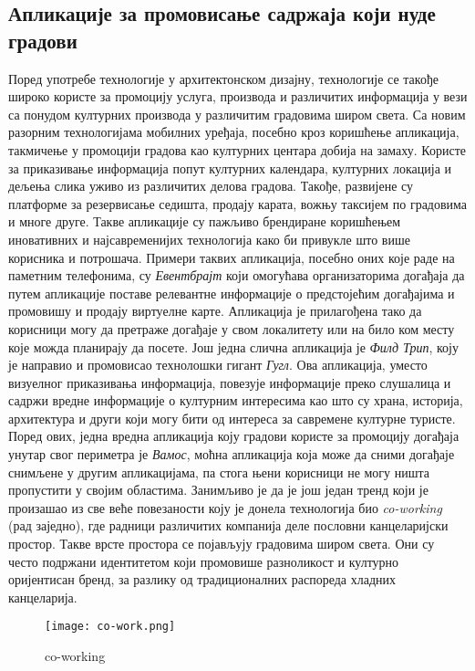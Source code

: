 \documentclass{article}
\begin{document}
\subsection{Апликације за промовисање садржаја који нуде градови}
Поред употребе технологије у архитектонском дизајну, технологије се такође широко користе за промоцију услуга, производа и различитих информација у вези са понудом културних производа у различитим градовима широм света. Са новим разорним технологијама мобилних уређаја, посебно кроз коришћење апликација, такмичење у промоцији градова као културних центара добија на замаху. Користе за приказивање информација попут културних календара, културних локација и дељења слика уживо из различитих делова градова. Такође, развијене су платформе за резервисање седишта, продају карата, вожњу таксијем по градовима и многе друге. Такве апликације су пажљиво брендиране коришћењем иновативних и најсавременијих технологија како би привукле што више корисника и потрошача. Примери таквих апликација, посебно оних које раде на паметним телефонима, су \textit{Евентбрајт} који омогућава организаторима догађаја да путем апликације поставе релевантне информације о предстојећим догађајима и промовишу и продају виртуелне карте. Апликација је прилагођена тако да корисници могу да претраже догађаје у свом локалитету или на било ком месту које можда планирају да посете. Још једна слична апликација је \textit{Филд Трип}, коју је направио и промовисао технолошки гигант \textit{Гугл}. Ова апликација, уместо визуелног приказивања информација, повезује информације преко слушалица и садржи вредне информације о културним интересима као што су храна, историја, архитектура и други који могу бити од интереса за савремене културне туристе. Поред ових, једна вредна апликација коју градови користе за промоцију догађаја унутар свог периметра је \textit{Вамос}, моћна апликација која може да сними догађаје снимљене у другим апликацијама, па стога њени корисници не могу ништа пропустити у својим областима. Занимљиво је да је још један тренд који је произашао из све веће повезаности коју је донела технологија био \textit{co-working} (рад заједно), где радници различитих компанија деле пословни канцеларијски простор. Такве врсте простора се појављују градовима широм света. Они су често подржани идентитетом који промовише разноликост и културно оријентисан бренд, за разлику од традиционалних распореда хладних канцеларија.

\begin{figure}[H]
\centering
\texttt{[image: co-work.png]}
\caption{co-working}
\end{figure}
\end{document}
